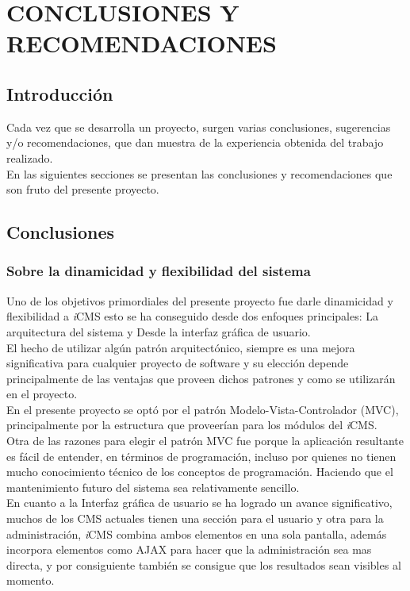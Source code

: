 \chapter{CONCLUSIONES Y RECOMENDACIONES}
\newpage

\section{Introducci\'on}
Cada vez que se desarrolla un proyecto, surgen varias conclusiones, sugerencias y/o recomendaciones, que dan muestra de la experiencia obtenida del trabajo realizado.\\
En las siguientes secciones se presentan las conclusiones y recomendaciones que son fruto del presente proyecto.

\section{Conclusiones}

\subsection{Sobre la dinamicidad y flexibilidad del sistema}
Uno de los objetivos primordiales del presente proyecto fue darle dinamicidad y flexibilidad a \textit{i}CMS esto se ha conseguido desde dos enfoques principales: La arquitectura del sistema y Desde la interfaz gr\'afica de usuario.\\

El hecho de utilizar alg\'un patr\'on arquitect\'onico, siempre es una mejora significativa para cualquier proyecto de software y su elecci\'on depende principalmente de las ventajas que proveen dichos patrones y como se utilizar\'an en el proyecto.\\
En el presente proyecto se opt\'o por el patr\'on Modelo-Vista-Controlador (MVC), principalmente por la estructura que proveer\'ian para los m\'odulos del \textit{i}CMS.\\
Otra de las razones para elegir el patr\'on MVC fue porque la aplicaci\'on resultante es f\'acil de entender, en t\'erminos de programaci\'on, incluso por quienes no tienen mucho conocimiento t\'ecnico de los conceptos de programaci\'on. Haciendo que el mantenimiento futuro del sistema sea relativamente sencillo.\\

En cuanto a la Interfaz gr\'afica de usuario se ha logrado un avance significativo, muchos de los CMS actuales tienen una secci\'on para el usuario y otra para la administraci\'on, \textit{i}CMS combina ambos elementos en una sola pantalla, adem\'as incorpora elementos como AJAX para hacer que la administraci\'on sea mas directa, y por consiguiente tambi\'en se consigue que los resultados sean visibles al momento.


